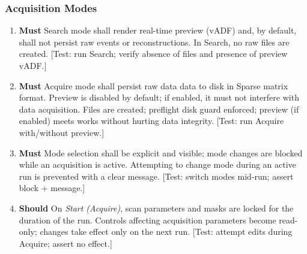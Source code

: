 \documentclass[12pt]{article}
\newcommand{\PriorityTag}[2]{%
  \colorbox{#2!25}{\footnotesize\textsf{\textbf{#1}}}\hspace{0.6em}}
\newcommand{\must}{\leavevmode\PriorityTag{Must}{green}}
\newcommand{\should}{\leavevmode\PriorityTag{Should}{yellow}}
\newcounter{reqgrp}[section] %
\newcounter{reqno}
\newcommand{\reqprefix}{GEN}
\newenvironment{requirements}[1]{%
  \renewcommand{\reqprefix}{#1}%
  \refstepcounter{reqgrp}%
  \setcounter{reqno}{0}%
  \begin{enumerate}[leftmargin=*]
}{\end{enumerate}}
\begin{document}
\subsubsection{Acquisition Modes}
\begin{requirements}{ACQ}

\item \must {}
  {Search mode shall render real-time preview (vADF) and, by default, shall not persist raw events or reconstructions.}
  {In Search, no raw files are created.}
  [Test: run Search; verify absence of files and presence of preview vADF.]

\item \must {}
  {Acquire mode shall persist raw data data to disk in Sparse matrix format. Preview is disabled by default; if enabled, it must not interfere with data acquisition.}
  {Files are created; preflight disk guard enforced; preview (if enabled) meets works without hurting data integrity.}
  [Test: run Acquire with/without preview.]

\item \must {}
  {Mode selection shall be explicit and visible; mode changes are blocked while an acquisition is active.}
  {Attempting to change mode during an active run is prevented with a clear message.}
  [Test: switch modes mid-run; assert block + message.]

\item \should {}
  {On \emph{Start (Acquire)}, scan parameters and masks are locked for the duration of the run.}
  {Controls affecting acquisition parameters become read-only; changes take effect only on the next run.}
  [Test: attempt edits during Acquire; assert no effect.]

\end{requirements}
\end{document}
